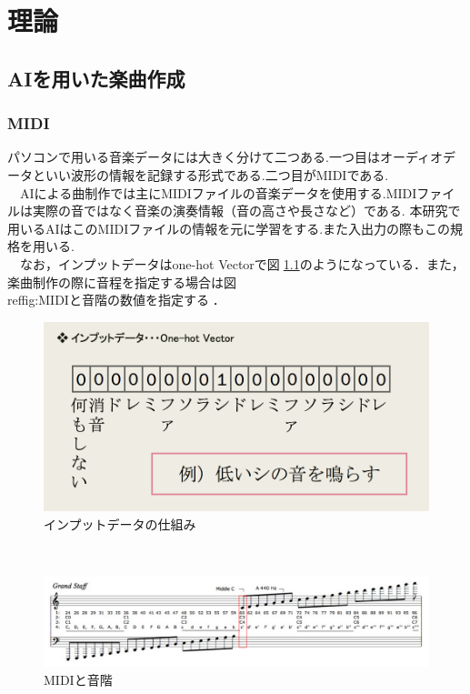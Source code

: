 \chapter{理論}
\section{AIを用いた楽曲作成}
\subsection{MIDI}
パソコンで用いる音楽データには大きく分けて二つある.一つ目はオーディオデータといい波形の情報を記録する形式である.二つ目がMIDIである.\\
　AIによる曲制作では主にMIDIファイルの音楽データを使用する.MIDIファイルは実際の音ではなく音楽の演奏情報（音の高さや長さなど）である.
本研究で用いるAIはこのMIDIファイルの情報を元に学習をする.また入出力の際もこの規格を用いる.\\
　なお，インプットデータはone-hot Vectorで図\ref{fig:インプットデータの仕組み}のようになっている．また，楽曲制作の際に音程を指定する場合は図\\ref{fig:MIDIと音階}の数値を指定する．
\begin{figure}[h]
    \begin{screen}
    \begin{center}
        \includegraphics[scale=0.8, clip]{./img/midi1.png}
        \caption{インプットデータの仕組み}
        \label{fig:インプットデータの仕組み}
    \end{center}
    \end{screen}
\end{figure}\\
\newpage
\begin{figure}[h]
    \begin{screen}
    \begin{center}
        \includegraphics[scale=0.48, clip]{./img/midi2.png}
        \caption{MIDIと音階}
        \label{fig:MIDIと音階}
    \end{center}
    \end{screen}
\end{figure}\\
